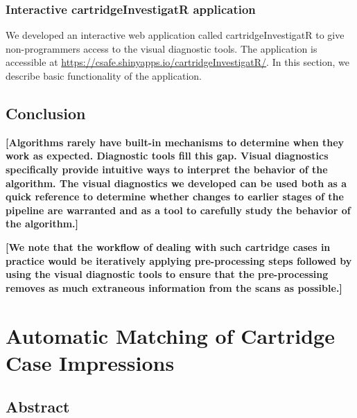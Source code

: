 \documentclass[11pt,]{isuthesis}
\begin{document}
\hypertarget{interactive-cartridgeinvestigatr-application}{%
\subsection{Interactive cartridgeInvestigatR application}\label{interactive-cartridgeinvestigatr-application}}

We developed an interactive web application called cartridgeInvestigatR to give non-programmers access to the visual diagnostic tools.
The application is accessible at \url{https://csafe.shinyapps.io/cartridgeInvestigatR/}.
In this section, we describe basic functionality of the application.

\hypertarget{conclusion-1}{%
\section{Conclusion}\label{conclusion-1}}

\textbf{{[}Algorithms rarely have built-in mechanisms to determine when they work as expected. Diagnostic tools fill this gap. Visual diagnostics specifically provide intuitive ways to interpret the behavior of the algorithm. The visual diagnostics we developed can be used both as a quick reference to determine whether changes to earlier stages of the pipeline are warranted and as a tool to carefully study the behavior of the algorithm.{]}}

\textbf{{[}We note that the workflow of dealing with such cartridge cases in practice would be iteratively applying pre-processing steps followed by using the visual diagnostic tools to ensure that the pre-processing removes as much extraneous information from the scans as possible.{]}}

\hypertarget{automatic-matching-of-cartridge-case-impressions}{%
\chapter{Automatic Matching of Cartridge Case Impressions}\label{automatic-matching-of-cartridge-case-impressions}}

\hypertarget{abstract-2}{%
\section*{Abstract}\label{abstract-2}}
\end{document}
